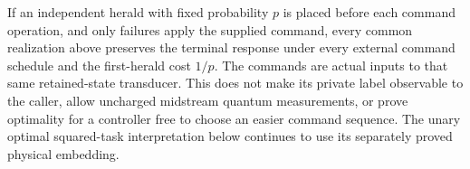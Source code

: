 If an independent herald with fixed probability $p$ is placed before each command operation, and only failures apply the supplied command, every common realization above preserves the terminal response under every external command schedule and the first-herald cost $1/p$. The commands are actual inputs to that same retained-state transducer. This does not make its private label observable to the caller, allow uncharged midstream quantum measurements, or prove optimality for a controller free to choose an easier command sequence. The unary optimal squared-task interpretation below continues to use its separately proved physical embedding.
